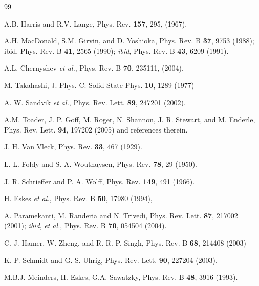 \documentclass[aps,prb,twocolumn,superscriptaddress,
               amsmath]{revtex4}
\renewcommand{\=}{\,=\,}
\newcommand{\+}{\,+\,}
\renewcommand{\-}{\,-\,}
\begin{document}
\vspace{-6mm}






\begin{thebibliography}{99}


\vspace{-6mm}

\label{LHarris}
A.B. Harris and R.V. Lange, Phys. Rev. \textbf{157}, 295, (1967).

A.H. MacDonald, S.M. Girvin,  and D. Yoshioka, Phys. Rev. B {\bf 37}, 9753 (1988);
ibid, Phys. Rev. B {\bf 41}, 2565 (1990); {\it ibid}, Phys. Rev. B {\bf
43}, 6209 (1991).
\label{LMacDonald}


A.L. Chernyshev {\it et al.}, Phys. Rev. B {\bf 70}, 235111,
(2004).


M. Takahashi, J. Phys. C: Solid State Phys. {\bf 10}, 1289 (1977)



A. W. Sandvik {\it et al.}, Phys. Rev. Lett. {\bf 89}, 247201
(2002).


 A.M. Toader, J. P. Goff, M. Roger, N. Shannon,
J. R. Stewart, and M. Enderle, Phys. Rev. Lett. {\bf 94}, 197202 (2005)
and references therein.



J. H. Van Vleck, Phys. Rev. {\bf 33}, 467 (1929).

L. L. Foldy and S. A. Wouthuysen, Phys. Rev. {\bf 78}, 29 (1950).

J. R. Schrieffer and P. A. Wolff, Phys. Rev. {\bf 149}, 491 (1966).



H. Eskes {\it et al.},  Phys. Rev. B \textbf{50}, 17980 (1994),


A. Paramekanti, M. Randeria and N. Trivedi, Phys. Rev. Lett. {\bf 87}, 217002
(2001); {\it ibid}, {\it et al.}, Phys. Rev. B {\bf 70}, 054504 (2004).


C. J. Hamer, W. Zheng, and R. R. P. Singh, Phys. Rev. B {\bf 68}, 214408 (2003)



 K. P. Schmidt and G. S. Uhrig,
Phys. Rev. Lett. {\bf 90}, 227204 (2003).

 M.B.J. Meinders, H. Eskes, G.A. Sawatzky,
Phys. Rev. B {\bf 48}, 3916 (1993).



\end{thebibliography}
\end{document}
